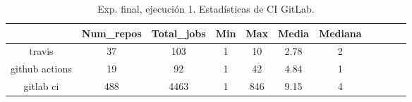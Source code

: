 \begin{table}[h]
  \centering
  \caption{Exp. final, ejecución 1. Estadísticas de CI GitLab.}
  \label{tab:tabla_f1_7}

\begin{footnotesize}
\renewcommand{\arraystretch}{1.5} %
\begin{tabular}{ccccccccccc}
  \hline
  {} &  Num\_repos &  Total\_jobs &  Min &  Max &  Media &  Mediana \\
  \hline
  travis         &         37 &         103 &    1 &   10 &   2.78 &        2 \\
  github actions &         19 &          92 &    1 &   42 &   4.84 &        1 \\
  gitlab ci      &        488 &        4463 &    1 &  846 &   9.15 &        4 \\
 \end{tabular}
\end{footnotesize}

\end{table}

